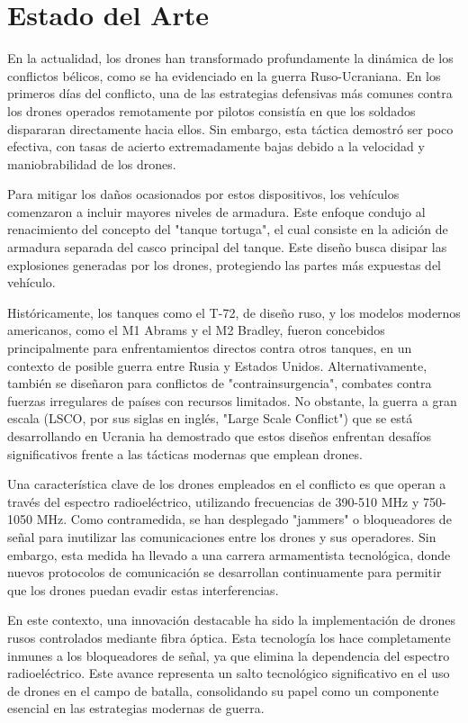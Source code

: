 \section{Estado del Arte}
\label{Estado del Arte}

En la actualidad, los drones han transformado profundamente la dinámica de los conflictos bélicos, como se ha evidenciado en la guerra Ruso-Ucraniana. En los primeros días del conflicto, una de las estrategias defensivas más comunes contra los drones operados remotamente por pilotos consistía en que los soldados dispararan directamente hacia ellos. Sin embargo, esta táctica demostró ser poco efectiva, con tasas de acierto extremadamente bajas debido a la velocidad y maniobrabilidad de los drones.

Para mitigar los daños ocasionados por estos dispositivos, los vehículos comenzaron a incluir mayores niveles de armadura. Este enfoque condujo al renacimiento del concepto del "tanque tortuga", el cual consiste en la adición de armadura separada del casco principal del tanque. Este diseño busca disipar las explosiones generadas por los drones, protegiendo las partes más expuestas del vehículo.

Históricamente, los tanques como el T-72, de diseño ruso, y los modelos modernos americanos, como el M1 Abrams y el M2 Bradley, fueron concebidos principalmente para enfrentamientos directos contra otros tanques, en un contexto de posible guerra entre Rusia y Estados Unidos. Alternativamente, también se diseñaron para conflictos de "contrainsurgencia", combates contra fuerzas irregulares de países con recursos limitados. No obstante, la guerra a gran escala (LSCO, por sus siglas en inglés, "Large Scale Conflict") que se está desarrollando en Ucrania ha demostrado que estos diseños enfrentan desafíos significativos frente a las tácticas modernas que emplean drones.

Una característica clave de los drones empleados en el conflicto es que operan a través del espectro radioeléctrico, utilizando frecuencias de 390-510 MHz y 750-1050 MHz. Como contramedida, se han desplegado "jammers" o bloqueadores de señal para inutilizar las comunicaciones entre los drones y sus operadores. Sin embargo, esta medida ha llevado a una carrera armamentista tecnológica, donde nuevos protocolos de comunicación se desarrollan continuamente para permitir que los drones puedan evadir estas interferencias.

En este contexto, una innovación destacable ha sido la implementación de drones rusos controlados mediante fibra óptica. Esta tecnología los hace completamente inmunes a los bloqueadores de señal, ya que elimina la dependencia del espectro radioeléctrico. Este avance representa un salto tecnológico significativo en el uso de drones en el campo de batalla, consolidando su papel como un componente esencial en las estrategias modernas de guerra.